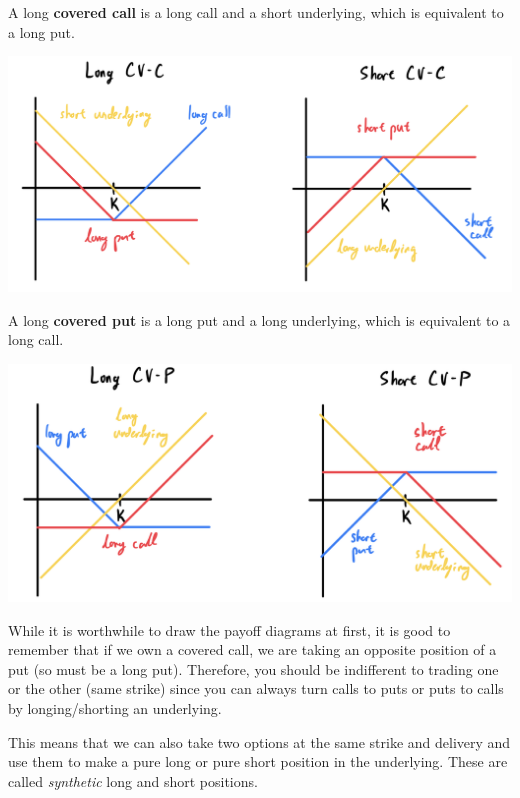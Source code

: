 \documentclass{article}
\begin{document}
    \begin{definition}
      A long \textbf{covered call} is a long call and a short underlying, which is equivalent to a long put. 
      \begin{center}
        \includegraphics[scale=0.3]{img/covered_call.png}
      \end{center}
    \end{definition}

    \begin{definition}
      A long \textbf{covered put} is a long put and a long underlying, which is equivalent to a long call. 
      \begin{center}
        \includegraphics[scale=0.3]{img/covered_put.png}
      \end{center}
    \end{definition}

    While it is worthwhile to draw the payoff diagrams at first, it is good to remember that if we own a covered call, we are taking an opposite position of a put (so must be a long put). Therefore, you should be indifferent to trading one or the other (same strike) since you can always turn calls to puts or puts to calls by longing/shorting an underlying.  

    This means that we can also take two options at the same strike and delivery and use them to make a pure long or pure short position in the underlying. These are called \textit{synthetic} long and short positions. 
\end{document}
